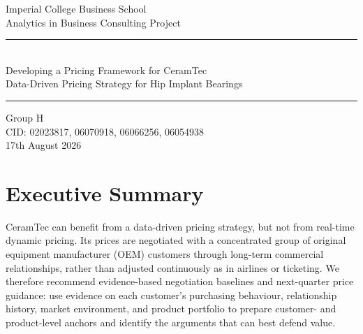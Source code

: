 \documentclass{article}
\begin{document}

\begin{titlepage}
\pagestyle{empty}
\begin{center}
\vspace*{1.5cm}
{\Large Imperial College Business School}\\[0.3cm]
{\large Analytics in Business Consulting Project}\\[0.5cm]
\rule{\textwidth}{1.2pt}\\[0.2cm]
\vspace{0.5cm}
{\Huge Developing a Pricing Framework for CeramTec}\\[0.25cm]
{\Large Data-Driven Pricing Strategy for Hip Implant Bearings}\\[0.2cm]
\vspace{0.2cm}
\rule{\textwidth}{1.2pt}
\vspace{0.5cm}

{\large Group H \\ CID: 02023817, 06070918, 06066256, 06054938}\\[0.2cm]
\vspace{0.5cm}
{\large 17th August 2026}\\[0.2cm]
\end{center}
\end{titlepage}

\pagestyle{fancy}
\singlespacing
\setcounter{page}{1}

\vspace{0.5em}


\section*{Executive Summary}

CeramTec can benefit from a data-driven pricing strategy, but not from real-time dynamic pricing. Its prices are negotiated with a concentrated group of original equipment manufacturer (OEM) customers through long-term commercial relationships, rather than adjusted continuously as in airlines or ticketing. We therefore recommend evidence-based negotiation baselines and next-quarter price guidance: use evidence on each customer's purchasing behaviour, relationship history, market environment, and product portfolio to prepare customer- and product-level anchors and identify the arguments that can best defend value.
\end{document}
